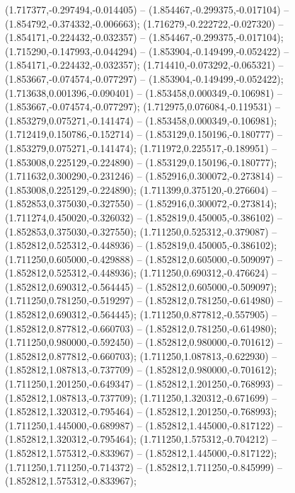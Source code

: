  (1.717377,-0.297494,-0.014405) -- (1.854467,-0.299375,-0.017104) -- (1.854792,-0.374332,-0.006663);
 (1.716279,-0.222722,-0.027320) -- (1.854171,-0.224432,-0.032357) -- (1.854467,-0.299375,-0.017104);
 (1.715290,-0.147993,-0.044294) -- (1.853904,-0.149499,-0.052422) -- (1.854171,-0.224432,-0.032357);
 (1.714410,-0.073292,-0.065321) -- (1.853667,-0.074574,-0.077297) -- (1.853904,-0.149499,-0.052422);
 (1.713638,0.001396,-0.090401) -- (1.853458,0.000349,-0.106981) -- (1.853667,-0.074574,-0.077297);
 (1.712975,0.076084,-0.119531) -- (1.853279,0.075271,-0.141474) -- (1.853458,0.000349,-0.106981);
 (1.712419,0.150786,-0.152714) -- (1.853129,0.150196,-0.180777) -- (1.853279,0.075271,-0.141474);
 (1.711972,0.225517,-0.189951) -- (1.853008,0.225129,-0.224890) -- (1.853129,0.150196,-0.180777);
 (1.711632,0.300290,-0.231246) -- (1.852916,0.300072,-0.273814) -- (1.853008,0.225129,-0.224890);
 (1.711399,0.375120,-0.276604) -- (1.852853,0.375030,-0.327550) -- (1.852916,0.300072,-0.273814);
 (1.711274,0.450020,-0.326032) -- (1.852819,0.450005,-0.386102) -- (1.852853,0.375030,-0.327550);
 (1.711250,0.525312,-0.379087) -- (1.852812,0.525312,-0.448936) -- (1.852819,0.450005,-0.386102);
 (1.711250,0.605000,-0.429888) -- (1.852812,0.605000,-0.509097) -- (1.852812,0.525312,-0.448936);
 (1.711250,0.690312,-0.476624) -- (1.852812,0.690312,-0.564445) -- (1.852812,0.605000,-0.509097);
 (1.711250,0.781250,-0.519297) -- (1.852812,0.781250,-0.614980) -- (1.852812,0.690312,-0.564445);
 (1.711250,0.877812,-0.557905) -- (1.852812,0.877812,-0.660703) -- (1.852812,0.781250,-0.614980);
 (1.711250,0.980000,-0.592450) -- (1.852812,0.980000,-0.701612) -- (1.852812,0.877812,-0.660703);
 (1.711250,1.087813,-0.622930) -- (1.852812,1.087813,-0.737709) -- (1.852812,0.980000,-0.701612);
 (1.711250,1.201250,-0.649347) -- (1.852812,1.201250,-0.768993) -- (1.852812,1.087813,-0.737709);
 (1.711250,1.320312,-0.671699) -- (1.852812,1.320312,-0.795464) -- (1.852812,1.201250,-0.768993);
 (1.711250,1.445000,-0.689987) -- (1.852812,1.445000,-0.817122) -- (1.852812,1.320312,-0.795464);
 (1.711250,1.575312,-0.704212) -- (1.852812,1.575312,-0.833967) -- (1.852812,1.445000,-0.817122);
 (1.711250,1.711250,-0.714372) -- (1.852812,1.711250,-0.845999) -- (1.852812,1.575312,-0.833967);
